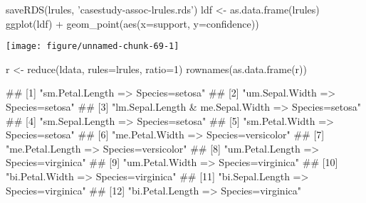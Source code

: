 \documentclass{article}\usepackage[]{graphicx}\usepackage[]{color}
\makeatletter
\def\maxwidth{ %
  \ifdim\Gin@nat@width>\linewidth
    \linewidth
  \else
    \Gin@nat@width
  \fi
}
\makeatother
\begin{document}
\begin{Schunk}
\begin{Sinput}
saveRDS(lrules, 'casestudy-assoc-lrules.rds')
ldf <- as.data.frame(lrules)
ggplot(ldf) +
  geom_point(aes(x=support, y=confidence))
\end{Sinput}

\texttt{[image: figure/unnamed-chunk-69-1]} 
\end{Schunk}

\begin{Schunk}
% --begin: "casestudy-assoc-reduce"
\begin{Sinput}
r <- reduce(ldata, rules=lrules, ratio=1)
rownames(as.data.frame(r))
\end{Sinput}
\begin{Soutput}
##  [1] "sm.Petal.Length => Species=setosa"                 
##  [2] "um.Sepal.Width => Species=setosa"                  
##  [3] "lm.Sepal.Length & me.Sepal.Width => Species=setosa"
##  [4] "sm.Sepal.Length => Species=setosa"                 
##  [5] "sm.Petal.Width => Species=setosa"                  
##  [6] "me.Petal.Width => Species=versicolor"              
##  [7] "me.Petal.Length => Species=versicolor"             
##  [8] "um.Petal.Length => Species=virginica"              
##  [9] "um.Petal.Width => Species=virginica"               
## [10] "bi.Petal.Width => Species=virginica"               
## [11] "bi.Sepal.Length => Species=virginica"              
## [12] "bi.Petal.Length => Species=virginica"
\end{Soutput}
%
% --end: "casestudy-assoc-reduce"
\end{Schunk}
\end{document}
